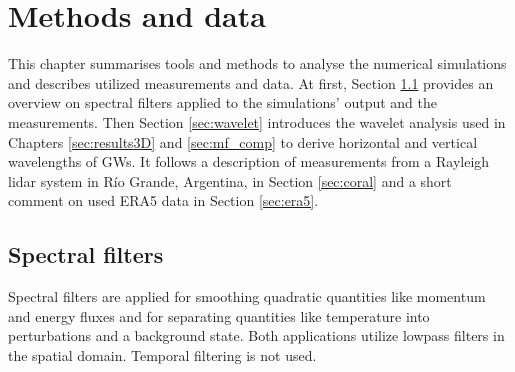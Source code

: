 \chapter{Methods and data}
\label{sec:methods}
This chapter summarises tools and methods to analyse the numerical simulations and describes utilized measurements and data. At first, Section \ref{sec:spectral_filter} provides an overview on spectral filters applied to the simulations' output and the measurements. Then Section \ref{sec:wavelet} introduces the wavelet analysis used in Chapters \ref{sec:results3D} and \ref{sec:mf_comp} to derive horizontal and vertical wavelengths of GWs. It follows a description of measurements from a Rayleigh lidar system in Río Grande, Argentina, in Section \ref{sec:coral} and a short comment on used ERA5 data in Section \ref{sec:era5}.

\section{Spectral filters}
\label{sec:spectral_filter}
Spectral filters are applied for smoothing quadratic quantities like momentum and energy fluxes and for separating quantities like temperature into perturbations and a background state. Both applications utilize lowpass filters in the spatial domain. Temporal filtering is not used.

